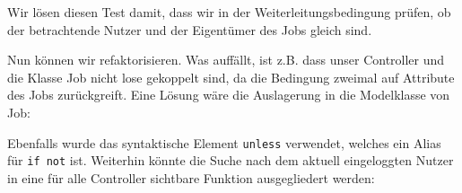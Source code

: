 \tddgreen
Wir lösen diesen Test damit, dass wir in der Weiterleitungsbedingung prüfen, ob der betrachtende Nutzer und der Eigentümer des Jobs gleich sind.

Nun können wir refaktorisieren. Was auffällt, ist z.B. dass unser Controller und die Klasse Job nicht lose gekoppelt sind, da die Bedingung zweimal auf Attribute des Jobs zurückgreift. Eine Lösung wäre die Auslagerung in die Modelklasse von Job:
\tddrefactor
%
%
\begin{ruby}[label=app/models/job.rb]
   
   
        
\end{ruby}
\begin{ruby}[label=app/controller/jobs\_controller.rb]
 
    \PY{o}{[}\PY{o}{]}
   \PY{o}{[}\PY{o}{]}
        
\end{ruby}

Ebenfalls wurde das syntaktische Element \texttt{unless} verwendet, welches ein Alias für \texttt{if not} ist.
Weiterhin könnte die Suche nach dem aktuell eingeloggten Nutzer in eine für alle Controller sichtbare Funktion ausgegliedert werden:
\tddrefactor

